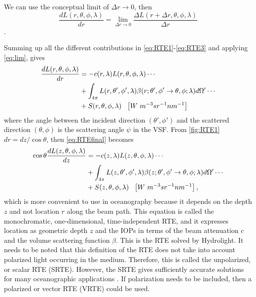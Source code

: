 We can use the conceptual limit of $\Delta r\rightarrow 0$, then
\begin{equation}\label{eq:lim}
  \frac{dL(r,\theta,\phi,\lambda)}{dr} = \lim_{\Delta r \to 0} \frac{\Delta L(r+\Delta r,\theta,\phi,\lambda)}{\Delta r}
\end{equation}. 

Summing up all the different contributions in \autoref{eq:RTE1}-\ref{eq:RTE3} and applying \autoref{eq:lim}, gives
\begin{align}\label{eq:RTEfinal}
  \frac{dL(r,\theta,\phi,\lambda)}{dr}&=-c(r,\lambda)L(r,\theta,\phi,\lambda)\cdots \notag \\
  &+\int_{4\pi} L(r,\theta',\phi',\lambda)\beta(r;\theta',\phi' \to \theta,\phi;\lambda)d\Omega'\cdots \notag  \\
  &+S(r,\theta,\phi,\lambda)~~\left[W~m^{-3}sr^{-1}nm^{-1} \right]
\end{align}
where the angle between the incident direction $(\theta',\phi')$ and the scattered direction $(\theta,\phi)$ is the scattering angle $\psi$ in the VSF. From \autoref{fig:RTE1} $dr=dz/\cos{\theta}$, then \autoref{eq:RTEfinal} becomes
\begin{align}\label{eq:RTEfinal2}
  \cos\theta\frac{dL(z,\theta,\phi,\lambda)}{dz}&=-c(z,\lambda)L(z,\theta,\phi,\lambda)\cdots \notag \\
  &+\int_{4\pi} L(z,\theta',\phi',\lambda)\beta(z;\theta',\phi' \to \theta,\phi;\lambda)d\Omega'\cdots \notag  \\
  &+S(z,\theta,\phi,\lambda)~~\left[W~m^{-3}sr^{-1}nm^{-1} \right],
\end{align}
which is more convenient to use in oceanography because it depends on the depth $z$ and not location $r$ along the beam path. This equation is called the monochromatic, one-dimensional, time-independent RTE, and it expresses location as geometric depth $z$ and the IOPs in terms of the beam attenuation $c$ and the volume scattering function $\beta$. This is the RTE solved by Hydrolight. It needs to be noted that this definition of the RTE does not take into account polarized light occurring in the medium. Therefore, this is called the unpolarized, or scalar RTE (SRTE). However, the SRTE gives sufficiently accurate solutions for many oceanographic applications \citep{MobleyOnline}. If polarization needs to be included, then a polarized or vector RTE (VRTE) could be used.

